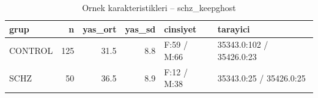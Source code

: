 \begin{table}[htbp]
  \centering
  \caption{Ornek karakteristikleri -- schz\_keepghost}
  \label{tab:sample_schz_keepghost}
  \small
  \begin{tabular}{lrrrll}
    \toprule
    grup & n & yas\_ort & yas\_sd & cinsiyet & tarayici \\
    \midrule
    CONTROL & 125 & 31.5 & 8.8 & F:59 / M:66 & 35343.0:102 / 35426.0:23 \\
    SCHZ & 50 & 36.5 & 8.9 & F:12 / M:38 & 35343.0:25 / 35426.0:25 \\
    \bottomrule
  \end{tabular}
\end{table}
